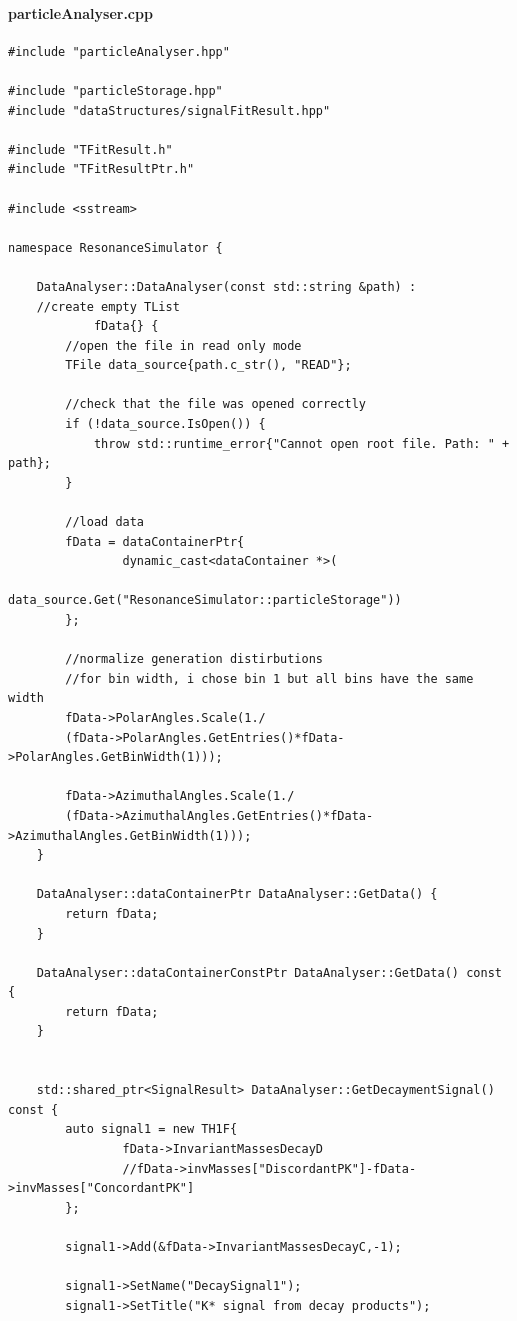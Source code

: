 \documentclass[12pt, a4paper]{article}
\begin{document}
\paragraph{particleAnalyser.cpp}


\begin{verbatim}
#include "particleAnalyser.hpp"

#include "particleStorage.hpp"
#include "dataStructures/signalFitResult.hpp"

#include "TFitResult.h"
#include "TFitResultPtr.h"

#include <sstream>

namespace ResonanceSimulator {

    DataAnalyser::DataAnalyser(const std::string &path) :
    //create empty TList
            fData{} {
        //open the file in read only mode
        TFile data_source{path.c_str(), "READ"};

        //check that the file was opened correctly
        if (!data_source.IsOpen()) {
            throw std::runtime_error{"Cannot open root file. Path: " + path};
        }

        //load data
        fData = dataContainerPtr{
                dynamic_cast<dataContainer *>(
                data_source.Get("ResonanceSimulator::particleStorage"))
        };
        
        //normalize generation distirbutions
        //for bin width, i chose bin 1 but all bins have the same width
        fData->PolarAngles.Scale(1./
        (fData->PolarAngles.GetEntries()*fData->PolarAngles.GetBinWidth(1)));
        
        fData->AzimuthalAngles.Scale(1./
        (fData->AzimuthalAngles.GetEntries()*fData->AzimuthalAngles.GetBinWidth(1)));
    }

    DataAnalyser::dataContainerPtr DataAnalyser::GetData() {
        return fData;
    }

    DataAnalyser::dataContainerConstPtr DataAnalyser::GetData() const {
        return fData;
    }


    std::shared_ptr<SignalResult> DataAnalyser::GetDecaymentSignal() const {
        auto signal1 = new TH1F{
                fData->InvariantMassesDecayD
                //fData->invMasses["DiscordantPK"]-fData->invMasses["ConcordantPK"]
        };

        signal1->Add(&fData->InvariantMassesDecayC,-1);

        signal1->SetName("DecaySignal1");
        signal1->SetTitle("K* signal from decay products");


\end{verbatim}
\end{document}
